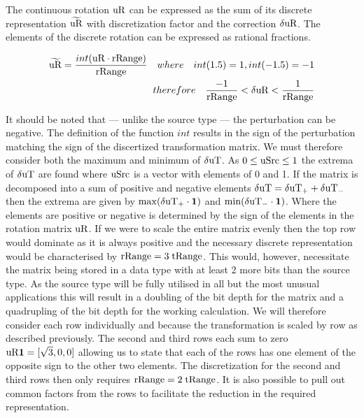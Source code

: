 The continuous rotation $\text{uR}$ can be expressed as the sum of its discrete representation $\widetilde{\text{uR}}$ with discretization factor and the correction $\delta\text{uR}$. The elements of the discrete rotation can be expressed as rational fractions.

\begin{eqnarray}\label{eq:dRRange}
\widetilde{\text{uR}} = \dfrac{int(\text{uR} \cdot \text{rRange})}{\text{rRange}}\quad where\quad int(1.5) = 1, int (-1.5) = -1\\
therefore\quad \dfrac{-1}{\text{rRange}} < \delta\text{uR}  < \dfrac{1}{\text{rRange}}
\end{eqnarray}

It should be noted that --- unlike the source type \uSrc --- the perturbation can be negative. The definition of the function $int$ results in the sign of the perturbation matching the sign of the discertized transformation matrix. We must therefore consider both the maximum and minimum of $\delta\text{uT}$. As $0 \le\text{uSrc} \le 1$ the extrema of $\delta\text{uT}$ are found where $\text{uSrc}$ is a vector with elements of 0 and 1. If the matrix is decomposed into a sum of positive and negative elements $\delta\text{uT} = \delta\text{uT}_+ + \delta\text{uT}_-$ then the extrema are given by $\max(\delta\text{uT}_+ \cdot \mathbf{1})$ and $\min(\delta\text{uT}_- \cdot \mathbf{1})$. Where the elements are positive or negative is determined by the sign of the elements in the rotation matrix $\text{uR}$. If we were to scale the entire matrix evenly then the top row would dominate as it is always positive and the necessary discrete representation would be characterised by $\text{rRange} = 3 \; \text{tRange}$. This would, however, necessitate the matrix being stored in a data type with at least 2 more bits than the source type. As the source type will be fully utilised in all but the most unusual applications this will result in a doubling of the bit depth for the matrix and a quadrupling of the bit depth for the working calculation. We will therefore consider each row individually and because the transformation is scaled by row as described previously. The second and third rows each sum to zero $\text{uR} \mathbf{1} = [\sqrt{3},0,0]$ allowing us to state that each of the rows has one element of the opposite sign to the other two elements. The discretization for the second and third rows then only requires $\text{rRange} = 2 \; \text{tRange}$. It is also possible to pull out common factors from the rows to facilitate the reduction in the required representation.

